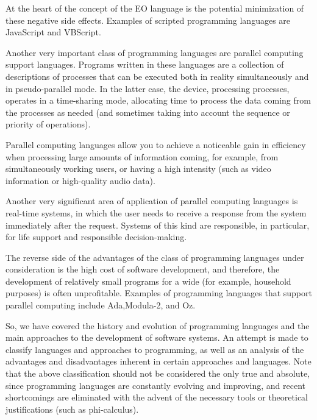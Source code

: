 \documentclass[12pt]{book}
\begin{document}
At the heart of the concept of the EO language is the potential minimization of these negative side effects. Examples of scripted programming languages are JavaScript and  VBScript.

Another very important class of programming languages are parallel computing support languages. Programs written in these languages are a collection of descriptions of processes that can be executed both in reality simultaneously and in pseudo-parallel mode. In the latter case, the device, processing processes, operates in a time-sharing mode, allocating time to process the data coming from the processes as needed (and sometimes taking into account the sequence or priority of operations).

Parallel computing languages allow you to achieve a noticeable gain in efficiency when processing large amounts of information coming, for example, from simultaneously working users, or having a high intensity (such as video information or high-quality audio data).

Another very significant area of application of parallel computing languages is real-time systems, in which the user needs to receive a response from the system immediately after the request. Systems of this kind are responsible, in particular, for life support and responsible decision-making.

The reverse side of the advantages of the class of programming languages under consideration is the high cost of software development, and therefore, the development of relatively small programs for a wide (for example, household purposes) is often unprofitable.
Examples of programming languages that support parallel computing include Ada,Modula-2, and  Oz.

So, we have covered the  history and evolution of programming languages  and the main approaches to the development of software systems. An attempt is made to classify languages and approaches to programming, as well as an analysis of the advantages and disadvantages inherent in certain approaches and languages. Note that the above classification should not be considered the only true and absolute, since programming languages are constantly evolving and improving, and recent shortcomings are eliminated with the advent of the necessary tools or theoretical justifications (such as phi-calculus).
\end{document}
